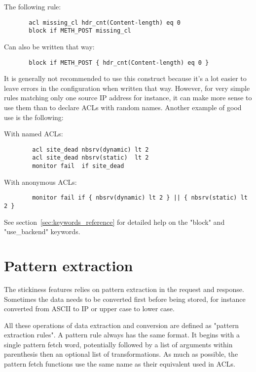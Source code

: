    The following rule:

\begin{verbatim}
       acl missing_cl hdr_cnt(Content-length) eq 0
       block if METH_POST missing_cl
\end{verbatim}

   Can also be written that way:

\begin{verbatim}
       block if METH_POST { hdr_cnt(Content-length) eq 0 }
\end{verbatim}

It is generally not recommended to use this construct because it's a lot easier
to leave errors in the configuration when written that way. However, for very
simple rules matching only one source IP address for instance, it can make more
sense to use them than to declare ACLs with random names. Another example of
good use is the following:

   With named ACLs:
   
   \begin{verbatim}
        acl site_dead nbsrv(dynamic) lt 2
        acl site_dead nbsrv(static)  lt 2
        monitor fail  if site_dead
   \end{verbatim}

   With anonymous ACLs:

   \begin{verbatim}
        monitor fail if { nbsrv(dynamic) lt 2 } || { nbsrv(static) lt 2 }
   \end{verbatim}

See section~\ref{sec:keywords_reference} for detailed help on the "block" and "use\_backend" keywords.

\section{Pattern extraction}
\label{sec:pattern_extraction}

The stickiness features relies on pattern extraction in the request and
response. Sometimes the data needs to be converted first before being stored,
for instance converted from ASCII to IP or upper case to lower case.

All these operations of data extraction and conversion are defined as
"pattern extraction rules". A pattern rule always has the same format. It
begins with a single pattern fetch word, potentially followed by a list of
arguments within parenthesis then an optional list of transformations. As
much as possible, the pattern fetch functions use the same name as their
equivalent used in ACLs.

